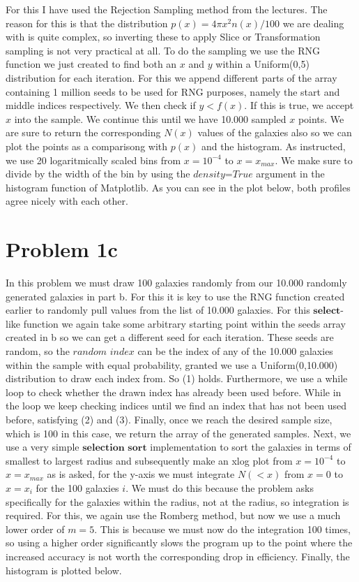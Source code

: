For this I have used the Rejection Sampling method from the lectures. The reason for this is that the distribution $p(x) = 4\pi x^2 n(x)/100$ we are dealing with is quite complex, so inverting these to apply Slice or Transformation sampling is not very practical at all. To do the sampling we use the RNG function we just created to find both an $x$ and $y$ within a Uniform(0,5) distribution for each iteration. For this we append different parts of the array containing 1 million seeds to be used for RNG purposes, namely the start and middle indices respectively. We then check if $y < f(x)$. If this is true, we accept $x$ into the sample. We continue this until we have 10.000 sampled $x$ points. We are sure to return the corresponding $N(x)$ values of the galaxies also so we can plot the points as a comparisong with $p(x)$ and the histogram. As instructed, we use 20 logaritmically scaled bins from $x = 10^{-4}$ to $x = x_{max}$. We make sure to divide by the width of the bin by using the $\textit{density=True}$ argument in the histogram function of Matplotlib. As you can see in the plot below, both profiles agree nicely with each other. 


\section*{Problem 1c}

In this problem we must draw 100 galaxies randomly from our 10.000 randomly generated galaxies in part b. For this it is key to use the RNG function created earlier to randomly pull values from the list of 10.000 galaxies. For this $\textbf{select}$-like function we again take some arbitrary starting point within the seeds array created in b so we can get a different seed for each iteration. These seeds are random, so the $\textit{random index}$ can be the index of any of the 10.000 galaxies within the sample with equal probability, granted we use a Uniform(0,10.000) distribution to draw each index from. So (1) holds. Furthermore, we use a while loop to check whether the drawn index has already been used before. While in the loop we keep checking indices until we find an index that has not been used before, satisfying (2) and (3). Finally, once we reach the desired sample size, which is 100 in this case, we return the array of the generated samples. Next, we use a very simple $\textbf{selection sort}$ implementation to sort the galaxies in terms of smallest to largest radius and subsequently make an xlog plot from $x=10^{-4}$ to $x = x_{max}$ as is asked, for the y-axis we must integrate $N(<x)$ from $x=0$ to $x=x_i$ for the 100 galaxies $i$. We must do this because the problem asks specifically for the galaxies within the radius, not at the radius, so integration is required. For this, we again use the Romberg method, but now we use a much lower order of $m=5$. This is because we must now do the integration 100 times, so using a higher order significantly slows the program up to the point where the increased accuracy is not worth the corresponding drop in efficiency. Finally, the histogram is plotted below.


